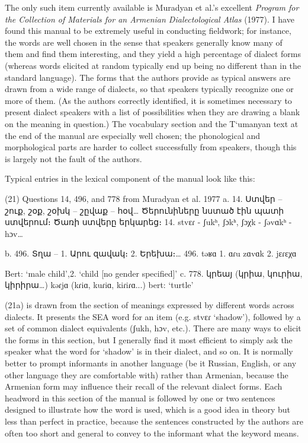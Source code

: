 \begin{exe}
The only such item currently available is Muradyan et al.’s excellent \textit{Program for the Collection of Materials for an Armenian Dialectological Atlas} (1977). I have found this manual to be extremely useful in conducting fieldwork; for instance, the words are well chosen in the sense that speakers generally know many of them and find them interesting, and they yield a high percentage of dialect forms (whereas words elicited at random typically end up being no different than in the standard language). The forms that the authors provide as typical answers are drawn from a wide range of dialects, so that speakers typically recognize one or more of them. (As the authors correctly identified, it is sometimes necessary to present dialect speakers with a list of possibilities when they are drawing a blank on the meaning in question.) The vocabulary section and the T‘umanyan text at the end of the manual are especially well chosen; the phonological and morphological parts are harder to collect successfully from speakers, though this is largely not the fault of the authors.

Typical entries in the lexical component of the manual look like this:


\begin{exe} \ex 
	(21)	Questions 14, 496, and 778 from Muradyan et al. 1977
	a. 14. Ստվեր – շուք, շօք, շօխկ – շըվաք – հօվ…
	Ծերունիները նստած էին պատի ստվերում։
	Ծառի ստվերը երկարեց։
	14. 	stvɛɾ - ʃukʰ, ʃɔkʰ, ʃɔχk - ʃǝvɑkʰ - hɔv…
	
	b. 496. Տղա – 1. Արու զավակ։ 2. Երեխա։…
	496. təʁɑ 1. ɑɾu zɑvɑk   2. jɛɾɛχɑ  
	
	Bert: ‘male child’,2. ‘child [no gender specified]’
	c. 778. կրեայ (կրիա, կուրիա, կիրիրա…)
	kǝɾjɑ (kɾiɑ, kuɾiɑ, kiɾiɾɑ...)  
	bert: ‘turtle’
	
\end{exe}


(21a) is drawn from the section of meanings expressed by different words across dialects. It presents the SEA word for an item (e.g. stvɛɾ ‘shadow’), followed by a set of common dialect equivalents (ʃukh, hɔv, etc.). There are many ways to elicit the forms in this section, but I generally find it most efficient to simply ask the speaker what the word for ‘shadow’ is in their dialect, and so on. It is normally better to prompt informants in another language (be it Russian, English, or any other language they are comfortable with) rather than Armenian, because the Armenian form may influence their recall of the relevant dialect forms. Each headword in this section of the manual is followed by one or two sentences designed to illustrate how the word is used, which is a good idea in theory but less than perfect in practice, because the sentences constructed by the authors are often too short and general to convey to the informant what the keyword means.


\end{exe}
